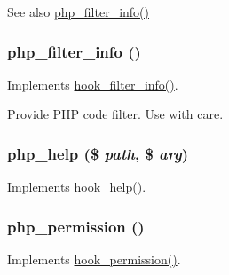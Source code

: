 \begin{DoxySeeAlso}{See also}
\hyperlink{php_8module_a623699ac83c3473534eb2b8a96f052d2}{php\_\-filter\_\-info()} 
\end{DoxySeeAlso}
\hypertarget{php_8module_a623699ac83c3473534eb2b8a96f052d2}{
\subsubsection[{php\_\-filter\_\-info}]{\setlength{\rightskip}{0pt plus 5cm}php\_\-filter\_\-info ()}}
\label{php_8module_a623699ac83c3473534eb2b8a96f052d2}
Implements \hyperlink{group__hooks_gaf2a2f2a46589420df896a0d42247f15a}{hook\_\-filter\_\-info()}.

Provide PHP code filter. Use with care. \hypertarget{php_8module_acec1f98958265ede43be9077b5e7558b}{
\subsubsection[{php\_\-help}]{\setlength{\rightskip}{0pt plus 5cm}php\_\-help (\$ {\em path}, \/  \$ {\em arg})}}
\label{php_8module_acec1f98958265ede43be9077b5e7558b}
Implements \hyperlink{group__hooks_ga5589c2714a782738e8851c4c90231f0e}{hook\_\-help()}. \hypertarget{php_8module_a50e182896bf2c44c821b27b3d9332cd5}{
\subsubsection[{php\_\-permission}]{\setlength{\rightskip}{0pt plus 5cm}php\_\-permission ()}}
\label{php_8module_a50e182896bf2c44c821b27b3d9332cd5}
Implements \hyperlink{group__hooks_ga2b22b45f4925f2478412477bae329713}{hook\_\-permission()}. 